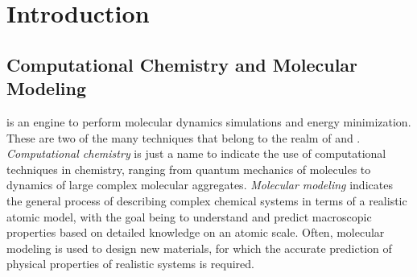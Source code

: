 %
%
%
%
%
%

\chapter{Introduction}

\section{Computational Chemistry and Molecular Modeling}

\label{sec:Compchem}

{\gromacs} is an engine to perform molecular dynamics simulations and 
energy minimization. These are two of the many techniques that belong 
to the realm of  and 
. 
{\em Computational chemistry} is just a name to indicate the use of 
computational techniques in chemistry, ranging from quantum mechanics 
of molecules to dynamics of large complex molecular aggregates. {\em 
Molecular modeling} indicates the general process of describing 
complex chemical systems in terms of a realistic atomic model, with the 
goal being to understand and predict macroscopic properties based on detailed 
knowledge on an atomic scale. Often, molecular modeling is used to 
design new materials, for which the accurate prediction of physical 
properties of realistic systems is required. 

